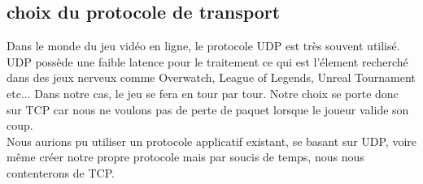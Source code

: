 \documentclass{article}
\begin{document}
        \subsection{choix du protocole de transport}
        Dans le monde du jeu vidéo en ligne, le protocole UDP est très souvent utilisé. UDP possède une faible latence pour le traitement
        ce qui est l'élement recherché dans des jeux nerveux comme Overwatch, League of Legends, Unreal Tournament etc... Dans notre
        cas, le jeu se fera en tour par tour. Notre choix se porte donc sur TCP car nous ne voulons pas de perte de paquet lorsque le joueur
        valide son coup.\\
        Nous aurions pu utiliser un protocole applicatif existant, se basant sur UDP, voire même créer notre propre protocole mais par soucis
        de temps, nous nous contenterons de TCP.
\end{document}
